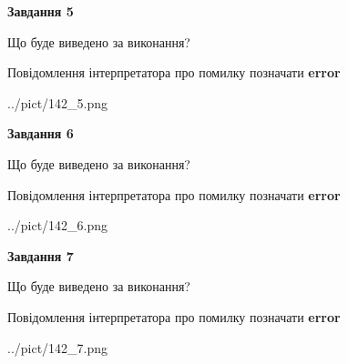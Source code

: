 \documentclass[10pt, ukrainian]{article}
\begin{document}
{\begin {large}
{\begin {center}\textbf{Завдання 5}\end {center}}\par
Що буде виведено за виконання? \par
Повідомлення інтерпретатора про помилку позначати \textbf{error}

\begin{center}
	{../pict/142_5.png}
\end{center}
\newpage

{\begin {center}\textbf{Завдання 6}\end {center}}\par
Що буде виведено за виконання? \par
Повідомлення інтерпретатора про помилку позначати \textbf{error}

\begin{center}
	{../pict/142_6.png}
\end{center}
\newpage

{\begin {center}\textbf{Завдання 7}\end {center}}\par
Що буде виведено за виконання? \par
Повідомлення інтерпретатора про помилку позначати \textbf{error}

\begin{center}
	{../pict/142_7.png}
\end{center}
\newpage

\end {large}}
\end{document}

